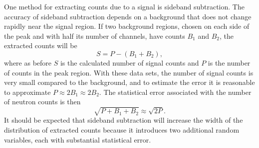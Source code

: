 One method for extracting counts due to a signal is sideband subtraction.  The accuracy of sideband subtraction depends on a background that does not change rapidly near the signal region.  If two background regions, chosen on each side of the peak and with half its number of channels, have counts $B_1$ and $B_2$, the extracted counts will be
\begin{equation}
S = P - (B_1 + B_2),
\end{equation}
where as before $S$ is the calculated number of signal counts and $P$ is the number of counts in the peak region.  With these data sets, the number of signal counts is very small compared to the background, and to estimate the error it is reasonable to approximate $P \approx 2 B_1 \approx 2 B_2$.  The statistical error associated with the number of neutron counts is then
\begin{equation}
\sqrt{P + B_1 + B_2} \approx \sqrt{2 P}.
\end{equation}
It should be expected that sideband subtraction will increase the width of the distribution of extracted counts because it introduces two additional random variables, each with substantial statistical error.  

